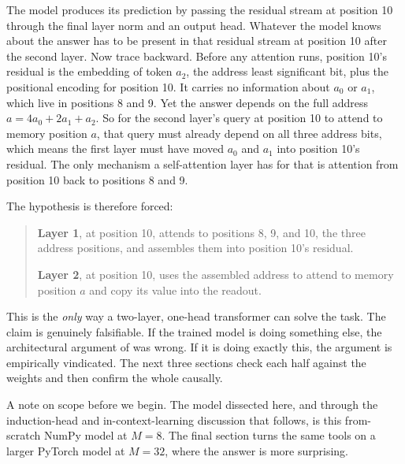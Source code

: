 The model produces its prediction by passing the residual stream at position 10
through the final layer norm and an output head. Whatever the model knows about
the answer has to be present in that residual stream at position 10 after the
second layer. Now trace backward. Before any attention runs, position 10's
residual is the embedding of token $a_2$, the address least significant bit,
plus the positional encoding for position 10. It carries no information about
$a_0$ or $a_1$, which live in positions 8 and 9. Yet the answer depends on the
full address $a = 4 a_0 + 2 a_1 + a_2$. So for the second layer's query at
position 10 to attend to memory position $a$, that query must already depend on
all three address bits, which means the first layer must have moved $a_0$ and
$a_1$ into position 10's residual. The only mechanism a self-attention layer has
for that is attention from position 10 back to positions 8 and 9.

The hypothesis is therefore forced:

\begin{quote}
\textbf{Layer 1}, at position 10, attends to positions 8, 9, and 10, the three
address positions, and assembles them into position 10's residual.

\textbf{Layer 2}, at position 10, uses the assembled address to attend to memory
position $a$ and copy its value into the readout.
\end{quote}

This is the \emph{only} way a two-layer, one-head transformer can solve the task.
The claim is genuinely falsifiable. If the trained model is doing something else,
the architectural argument of  was wrong. If it is doing
exactly this, the argument is empirically vindicated. The next three sections
check each half against the weights and then confirm the whole causally.

A note on scope before we begin. The model dissected here, and through the
induction-head and in-context-learning discussion that follows, is this
from-scratch NumPy model at $M = 8$. The final section turns the same tools on a
larger PyTorch model at $M = 32$, where the answer is more surprising.
